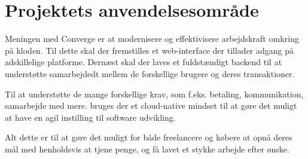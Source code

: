 \section{Projektets anvendelsesområde}

Meningen med Converge er at modernisere og effektivisere arbejdskraft omkring på kloden. Til dette skal der fremstilles et web-interface der tillader adgang på adskillelige platforme. Dernæst skal der laves et fuldstændigt backend til at understøtte samarbejdedt mellem de forskellige brugere og deres transaktioner.

Til at understøtte de mange forskellige krav, som f.eks. betaling, kommunikation, samarbejde med mere. bruges der et cloud-native mindset til at gøre det muligt at have en agil instilling til software udvikling.

Alt dette er til at gøre det muligt for både freelancere og købere at opnå deres mål med henholdsvis at tjene penge, og få lavet et stykke arbejde efter ønske.

